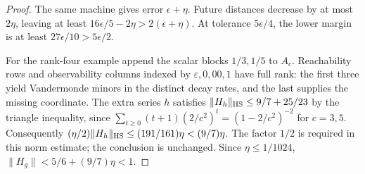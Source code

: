 \begin{proof}
The same machine gives error $\epsilon+\eta$. Future distances decrease
by at most $2\eta$, leaving at least $16\epsilon/5-2\eta>
2(\epsilon+\eta)$. At tolerance $5\epsilon/4$, the lower margin is
at least $27\epsilon/10>5\epsilon/2$.

For the rank-four example append the scalar blocks $1/3,1/5$ to $A_c$.
Reachability rows and observability columns indexed by
$\varepsilon,0,00,1$ have full rank: the first three yield Vandermonde
minors in the distinct decay rates, and the last supplies the missing
coordinate. The extra series $h$ satisfies
$\|H_h\|_{\rm HS}\le9/7+25/23$ by the triangle inequality, since
$\sum_{t\ge0}(t+1)(2/c^2)^t=(1-2/c^2)^{-2}$ for $c=3,5$.
Consequently $(\eta/2)\|H_h\|_{\rm HS}\le(191/161)\eta<(9/7)\eta$.
The factor $1/2$ is required in this norm estimate;
the conclusion is unchanged. Since $\eta\le1/1024$,
$\|H_g\|<5/6+(9/7)\eta<1$.
\end{proof}
